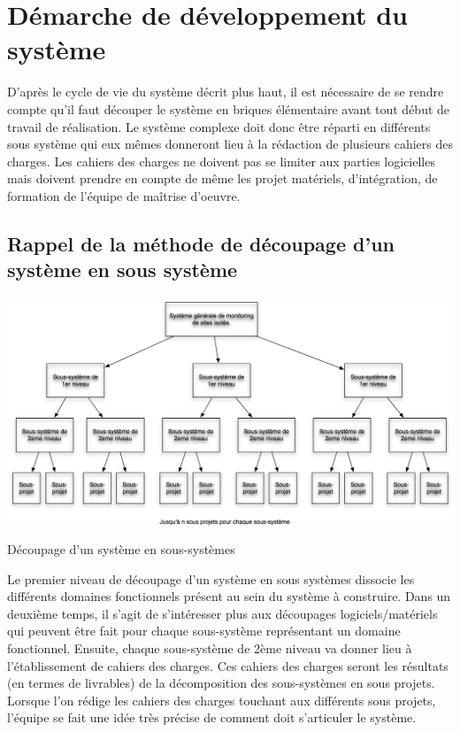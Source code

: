 \section{Démarche de développement du système}
D'après le cycle de vie du système décrit plus haut, il est nécessaire de se rendre compte qu'il faut découper le système en briques élémentaire avant tout début de travail de réalisation. Le système complexe doit donc être réparti en différents sous système qui eux mêmes donneront lieu à la rédaction de plusieurs cahiers des charges. Les cahiers des charges ne doivent pas se limiter aux parties logicielles mais doivent prendre en compte de même les projet matériels, d'intégration, de formation de l'équipe de maîtrise d'oeuvre.

\subsection{Rappel de la méthode de découpage d'un système en sous système}

\begin {center}
\includegraphics[width=\textwidth]{png/decoupageType.png}
\caption{Découpage d'un système en sous-systèmes}
\end {center}

Le premier niveau de découpage d'un système en sous systèmes dissocie les différents domaines fonctionnels présent au sein du système à construire. Dans un deuxième temps, il s'agit de s'intéresser plus aux découpages logiciels/matériels qui peuvent être fait pour chaque sous-système représentant un domaine fonctionnel.
Ensuite, chaque sous-système de 2ème niveau va donner lieu à l'établissement de cahiers des charges. Ces cahiers des charges seront les résultats (en termes de livrables) de la décomposition des sous-systèmes en sous projets. Lorsque l'on rédige les cahiers des charges touchant aux différents sous projets, l'équipe se fait une idée très précise de comment doit s'articuler le système.


